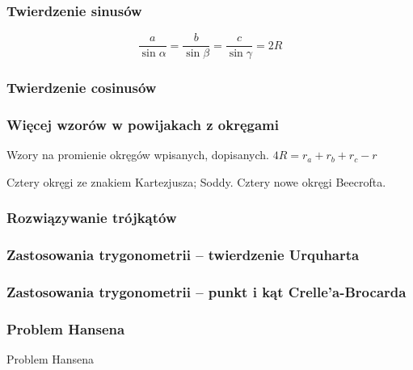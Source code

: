\subsubsection{Twierdzenie sinusów}

$$\frac{a}{\sin \alpha} = \frac{b}{\sin \beta} = \frac{c}{\sin \gamma} = 2R$$

\subsubsection{Twierdzenie cosinusów}


\subsubsection{Więcej wzorów w powijakach z okręgami}
Wzory na promienie okręgów wpisanych, dopisanych.
$4R = r_a + r_b + r_c - r$ %

Cztery okręgi ze znakiem Kartezjusza; Soddy.
Cztery nowe okręgi Beecrofta.

\subsubsection{Rozwiązywanie trójkątów}


\subsubsection{Zastosowania trygonometrii -- twierdzenie Urquharta}


\subsubsection{Zastosowania trygonometrii -- punkt i kąt Crelle'a-Brocarda}


\subsubsection{Problem Hansena}
Problem Hansena
%

